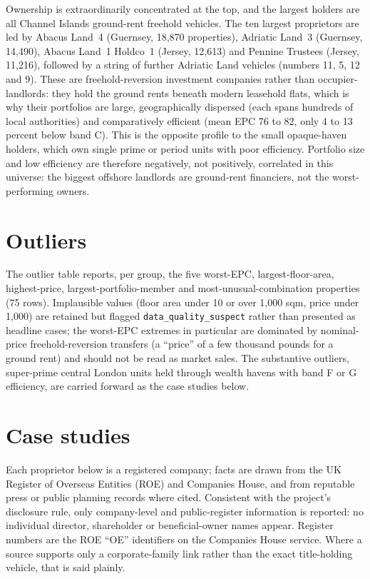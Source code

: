 \documentclass[11pt]{article}
\begin{document}
Ownership is extraordinarily concentrated at the top, and the largest holders
are all Channel Islands ground-rent freehold vehicles. The ten largest
proprietors are led by Abacus Land~4 (Guernsey, 18{,}870 properties), Adriatic
Land~3 (Guernsey, 14{,}490), Abacus Land~1 Holdco~1 (Jersey, 12{,}613) and
Pennine Trustees (Jersey, 11{,}216), followed by a string of further Adriatic
Land vehicles (numbers 11, 5, 12 and 9). These are freehold-reversion investment
companies rather than occupier-landlords: they hold the ground rents beneath
modern leasehold flats, which is why their portfolios are large, geographically
dispersed (each spans hundreds of local authorities) and comparatively efficient
(mean EPC 76 to 82, only 4 to 13 percent below band C). This is the opposite
profile to the small opaque-haven holders, which own single prime or period
units with poor efficiency. Portfolio size and low efficiency are therefore
negatively, not positively, correlated in this universe: the biggest offshore
landlords are ground-rent financiers, not the worst-performing owners.

\section{Outliers}

The outlier table reports, per group, the five worst-EPC, largest-floor-area,
highest-price, largest-portfolio-member and most-unusual-combination properties
(75 rows). Implausible values (floor area under 10 or over 1{,}000 sqm, price
under 1{,}000) are retained but flagged \texttt{data\_quality\_suspect} rather
than presented as headline cases; the worst-EPC extremes in particular are
dominated by nominal-price freehold-reversion transfers (a ``price'' of a few
thousand pounds for a ground rent) and should not be read as market sales. The
substantive outliers, super-prime central London units held through wealth
havens with band F or G efficiency, are carried forward as the case studies
below.

\section{Case studies}


Each proprietor below is a registered company; facts are drawn from the UK
Register of Overseas Entities (ROE) and Companies House, and from reputable press
or public planning records where cited. Consistent with the project's disclosure
rule, only company-level and public-register information is reported: no
individual director, shareholder or beneficial-owner names appear. Register
numbers are the ROE ``OE'' identifiers on the Companies House service. Where a
source supports only a corporate-family link rather than the exact title-holding
vehicle, that is said plainly.
\end{document}
